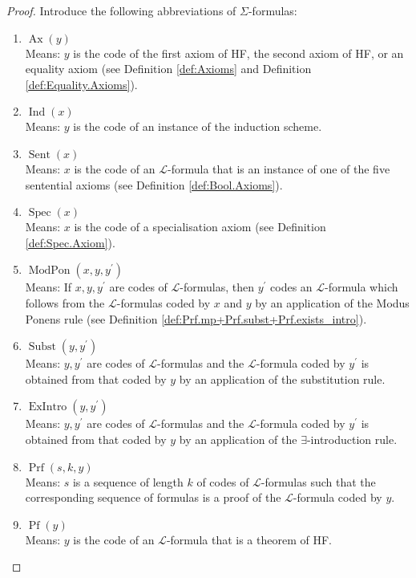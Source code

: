 \begin{proof}
    Introduce the following abbreviations of $\Sigma$-formulas:
    \begin{enumerate}
        \item $\operatorname{Ax}(y)$\\
        Means: $y$ is the code of the first axiom of HF, the second axiom of HF, or 
        an equality axiom 
        (see Definition \ref{def:Axioms} and Definition \ref{def:Equality.Axioms}).
        \item $\operatorname{Ind}(x)$\\
        Means: $y$ is the code of an instance of the induction scheme.
        \item $\operatorname{Sent}(x)$\\
        Means: $x$ is the code of an $\mathcal{L}$-formula that is an instance 
        of one of the five sentential axioms (see Definition \ref{def:Bool.Axioms}).
        \item $\operatorname{Spec}(x)$\\
        Means: $x$ is the code of a specialisation axiom (see Definition \ref{def:Spec.Axiom}).
        \item $\operatorname{ModPon}(x,y,y^\prime)$\\
        Means: If $x,y,y^\prime$ are codes of $\mathcal{L}$-formulas, 
        then $y^\prime$ codes an $\mathcal{L}$-formula which follows from the $\mathcal{L}$-formulas
        coded by $x$ and $y$ by an application of the Modus Ponens rule 
        (see Definition \ref{def:Prf.mp+Prf.subst+Prf.exists_intro}).
        \item $\operatorname{Subst}(y,y^\prime)$\\
        Means: $y,y^\prime$ are codes of $\mathcal{L}$-formulas and
        the $\mathcal{L}$-formula coded by $y^\prime$ is obtained from that coded by $y$ by
        an application of the substitution rule.
        \item $\operatorname{ExIntro}(y, y^\prime)$\\
        Means: $y,y^\prime$ are codes of $\mathcal{L}$-formulas and
        the $\mathcal{L}$-formula coded by $y^\prime$ is obtained from that coded by $y$ by
        an application of the $\exists$-introduction rule.
        \item $\operatorname{Prf}(s, k, y)$\\
        Means: $s$ is a sequence of length $k$ of codes of $\mathcal{L}$-formulas 
        such that the corresponding sequence of formulas is a proof of the 
        $\mathcal{L}$-formula coded by $y$.
        \item $\operatorname{Pf}(y)$\\
        Means: $y$ is the code of an $\mathcal{L}$-formula that is a theorem of HF.
    \end{enumerate}
\end{proof}

